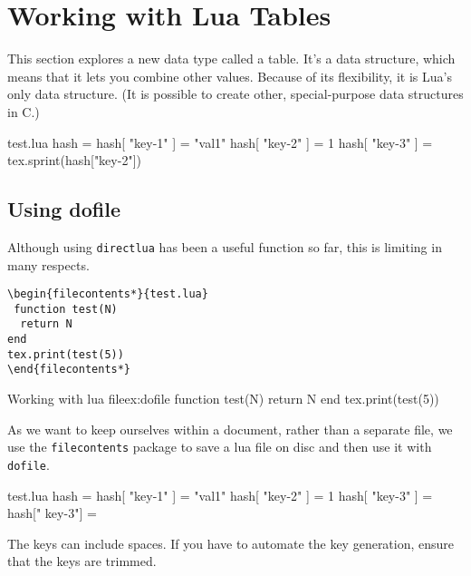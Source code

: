 \chapter{Working with Lua Tables}

This section explores a new data type called a table. It's a data structure, which means that it lets
you combine other values. Because of its flexibility, it is Lua’s only data structure. (It is possible to
create other, special-purpose data structures in C.)
\begin{phdverbatim}
\begin{filecontents*}{test.lua}
  hash = {}
  hash[ "key-1" ] = "val1"
  hash[ "key-2" ] = 1
  hash[ "key-3" ] = {}
  tex.sprint(hash["key-2"])
\end{filecontents*}
\end{phdverbatim}


\section{Using dofile}

Although using \lstinline{directlua} has been a useful function so far, this is limiting in many respects.

\begin{verbatim}
\begin{filecontents*}{test.lua}
 function test(N)
  return N
end
tex.print(test(5))
\end{filecontents*}
\end{verbatim}

\begin{texexample}{Working with lua file}{ex:dofile}
 function test(N)
   return N
 end
 tex.print(test(5))
\end{texexample}

As we want to keep ourselves within a document, rather than a separate file, we
use the \verb+filecontents+ package to save a lua file on disc and then use it with
\lstinline{dofile}.

\begin{phdverbatim}
\begin{filecontents*}{test.lua}
hash = {}
hash[ "key-1" ] = "val1"
hash[ "key-2" ] = 1
hash[ "key-3" ] = {}
hash[" key-3"] = {}
\end{filecontents*}
\end{phdverbatim}

The keys can include spaces. If you have to automate the key generation, ensure that the keys are trimmed.

